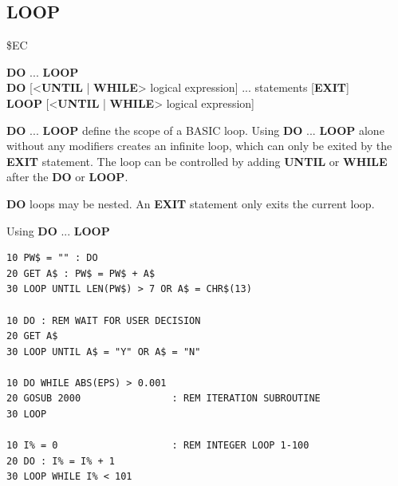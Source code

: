 \subsection{LOOP}
\begin{description}[leftmargin=2cm,style=nextline]
\item [Token:]    \$EC

\item [Format:]   {\bf DO} ... {\bf LOOP} \\
                  {\bf DO} [<{\bf UNTIL} | {\bf WHILE}> logical expression] ... statements [{\bf EXIT}] \\
                  {\bf LOOP} [<{\bf UNTIL} | {\bf WHILE}> logical expression]

\item [Usage:]    {\bf DO} ... {\bf LOOP} define the scope of a BASIC loop. Using {\bf DO} ... {\bf LOOP} alone without any modifiers creates an infinite loop, which can only be exited by the {\bf EXIT} statement. The loop can be controlled by adding {\bf UNTIL} or {\bf WHILE} after the {\bf DO} or {\bf LOOP}.

\item [Remarks:]  {\bf DO} loops may be nested. An {\bf EXIT} statement only exits the current loop.

\item [Examples:] Using {\bf DO} ... {\bf LOOP}

\begin{tcolorbox}[colback=black,coltext=white]
\verbatimfont{\codefont}
\begin{verbatim}
10 PW$ = "" : DO
20 GET A$ : PW$ = PW$ + A$
30 LOOP UNTIL LEN(PW$) > 7 OR A$ = CHR$(13)

10 DO : REM WAIT FOR USER DECISION
20 GET A$
30 LOOP UNTIL A$ = "Y" OR A$ = "N"

10 DO WHILE ABS(EPS) > 0.001
20 GOSUB 2000                : REM ITERATION SUBROUTINE
30 LOOP

10 I% = 0                    : REM INTEGER LOOP 1-100
20 DO : I% = I% + 1
30 LOOP WHILE I% < 101
\end{verbatim}
\end{tcolorbox}
\end{description}


\newpage
